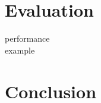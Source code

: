 ﻿\documentclass[
      english,
			conference,
      ]{IEEEtran}
\begin{document}






\section{Evaluation}
\label{sec:eval}

performance\\

example\\

\section{Conclusion}
\label{sec:conclusion}


\printbibliography
\end{document}

